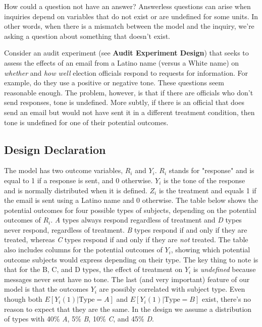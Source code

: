 \documentclass[11pt]{article}\usepackage[]{graphicx}\usepackage[]{color}
\newcommand\M{\marginnote{\LARGE \sc M}\noindent}
\begin{document}
How could a question not have an answer? Answerless questions can arise when inquiries depend on variables that do not exist or are undefined for some units. In other words, when there is a mismatch between the model and the inquiry, we're asking a question about something that doesn't exist.

Consider an audit experiment (see {\bf Audit Experiment Design}) that seeks to assess the effects of an email from a Latino name (versus a White name) on {\it whether} and {\it how well} election officials respond to requests for information. For example, do they use a positive or negative tone. These questions seem reasonable enough. The problem, however, is that if there are officials who don't send responses, tone is undefined. More subtly, if there is an official that does send an email but would not have sent it in a different treatment condition, then tone is undefined for one of their potential outcomes.  \smallskip

\subsection*{Design Declaration}

\M The model has two outcome variables, $R_i$ and $Y_i$. $R_i$ stands for "response" and is equal to 1 if a response is sent, and 0 otherwise. $Y_i$ is the tone of the response and is normally distributed when it is defined. $Z_i$ is the treatment and equals 1 if the email is sent using a Latino name and 0 otherwise. The table below shows the potential outcomes for four possible types of subjects, depending on the potential outcomes of $R_i$. {\it A} types always respond regardless of treatment and {\it D} types never respond, regardless of treatment. {\it B} types respond if and only if they are treated, whereas {\it C} types respond if and only if they are {\it not} treated. The table also includes columns for the potential outcomes of $Y_i$, showing which potential outcome subjects would express depending on their type. The key thing to note is that for the B, C, and D types, the effect of treatment on $Y_i$ is {\it undefined} because messages never sent have no tone. The last (and very important) feature of our model is that the outcomes $Y_i$ are possibly correlated with subject type. Even though both $E[Y_i(1) | \text{Type} = A]$ and $E[Y_i(1) | \text{Type} = B]$ exist, there's no reason to expect that they are the same. 
    In the design we assume a distribution of types with  40\% {\it A}, 5\% {\it B}, 10\% {\it C}, and 45\% {\it D}.
\end{document}
